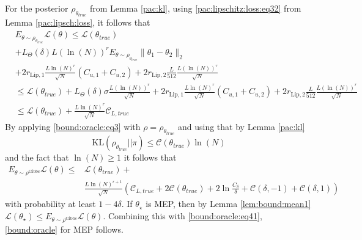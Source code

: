 \documentclass{article}
\newcommand{\KL}{\mathrm{KL}}
\renewcommand{\KL}{\mathrm{KL}}
\begin{document}
  For the posterior $\rho_{\theta_{true}}$ from Lemma \ref{pac:kl}, using
  \eqref{pac:lipschitz:loss:eq32} from Lemma \ref{pac:lipsch:loss}, it follows that
  \begin{align}
    & E_{\theta \sim \rho_{\theta_{true}}}  \mathcal{L}(\theta)  \le \mathcal{L}(\theta_{true})  \nonumber \\
    & +L_{\Theta}(\delta)L(\ln(N))^r E_{\theta \sim \rho_{\theta_{true}}}\|\theta_1 - \theta_2\|_2 \nonumber \\
          & + 2r_{\text{Lip},1}\frac{L\ln(N)^{r}}{\sqrt{N}}\left(C_{u,1} + C_{u,2}\right) +
            2r_{\text{Lip},2}  \frac{L}{512} \frac{L(\ln(N))^r}{\sqrt{N}} \nonumber \\
            & \le \mathcal{L}(\theta_{true})+ L_{\Theta}(\delta)\sigma \frac{L(\ln(N))^r}{\sqrt{N}}
          + 2r_{\text{Lip},1}\frac{L\ln(N)^{r}}{\sqrt{N}}\left(C_{u,1} + C_{u,2}\right) + 2r_{\text{Lip},2}  \frac{L}{512} \frac{L(\ln(N))^r}{\sqrt{N}}  \nonumber \\
        & \le \mathcal{L}(\theta_{true})+\frac{L\ln(N)^{r}}{\sqrt{N}} \mathcal{C}_{L,true}
      \label{bound:oracle:eq4}
  \end{align}
  By applying  \eqref{bound:oracle:eq3}  with $\rho=\rho_{\theta_{true}}$ and using that by Lemma \ref{pac:kl} 
  \[ \KL(\rho_{\theta_{true}} || \pi) \le \mathcal{C}(\theta_{true})\ln(N) \]
  and the fact that $\ln(N) \ge 1$ it follows that 
 \begin{align} 
    E_{\theta \sim \rho^{\text{Gibbs}}} \mathcal{L}(\theta) \le & \mathcal{L}(\theta_{true})+ \nonumber \\
      & \frac{L\ln(N)^{r+1}}{\sqrt{N}} \left( \mathcal{C}_{L,true} + 2\mathcal{C}(\theta_{true})
       +2\ln\frac{C_{\delta}}{\delta}+\mathcal{C}(\delta,-1)+\mathcal{C}(\delta,1) \right)
      \label{bound:oracle:eq41}
 \end{align}
 with probability at least $1-4\delta$.
 If $\theta_{\star}$ is MEP, then by Lemma \ref{lem:bound:mean1}
 $\mathcal{L}(\theta_{\star}) \le E_{\theta \sim \rho^{\text{Gibbs}}} \mathcal{L}(\theta)$. 
 Combining this with \eqref{bound:oracle:eq41}, \eqref{bound:oracle} for MEP follows.
\end{document}

